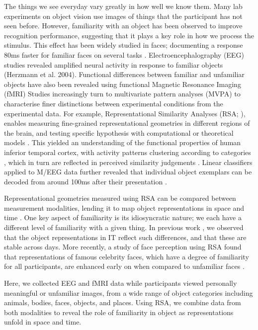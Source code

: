 \documentclass[10pt,letterpaper]{article}
\begin{document}
The things we see everyday vary greatly in how well we know them. 
Many lab experiments on object vision use images of things that 
the participant has not seen before. However, familiarity with 
an object has been observed to improve recognition performance, 
suggesting that it plays a key role in how we process the stimulus. 
This effect has been widely studied in faces; documenting a response 
80ms faster for familiar faces on several tasks 
\cite{Ramon2018-ou,Di_Oleggio_Castello2015-ij}. 
Electroencephalography (EEG) studies revealed  amplified neural 
activity in response to familiar objects (Herzmann et al. 2004). 
Functional differences between familiar and unfamiliar objects 
have also been revealed using functional Magnetic Resonance Imaging (fMRI)
\cite{Barense2011-td,McLelland2014-nw,Taylor2009-qu,Trinkler2009-zy} 
Studies increasingly turn to multivariate pattern analyses (MVPA) 
to characterise finer distinctions between experimental conditions 
from the experimental data. For example, Representational Similarity 
Analyses (RSA; \cite{Kriegeskorte2008-bp}), enables measuring fine-grained 
representational geometries in different regions of the brain, 
and testing specific hypothesis with computational or theoretical 
models \cite{Kriegeskorte2013-md}. This yielded an understanding 
of the functional properties of human inferior temporal cortex, 
with activity patterns clustering according to categories 
\cite{Haxby2001-kl,Kriegeskorte2008-bp}, which in turn are 
reflected in perceived similarity judgements \cite{Mur2013-ej}.  
Linear classifiers applied to M/EEG data further revealed that 
individual object exemplars can be decoded from around 100ms 
after their presentation \cite{Carlson2013-fw}. 

Representational geometries measured using RSA can be 
compared between measurement modalities, lending it to 
map object representations in space and time 
\cite{Cichy2014-bd,Cichy2016-tp}. One key aspect of 
familiarity is its idiosyncratic nature; we each have a 
different level of familiarity with a given thing. In previous work 
\cite{Charest2014-zn}, we observed that the object representations 
in IT reflect such differences, and that these are stable across days. 
More recently, a study of face perception using RSA found that 
representations of famous celebrity faces, which have a degree of 
familiarity for all participants, are enhanced early on when 
compared to unfamiliar faces \cite{Dobs2019-ov}. 

Here, we collected EEG and fMRI data while participants viewed 
personally meaningful or unfamiliar images, from a wide range 
of object categories including animals, bodies, faces, objects, 
and places. Using RSA, we combine data from both modalities to 
reveal the role of familiarity in object as representations 
unfold in space and time.
\end{document}

